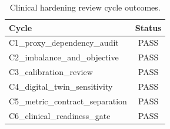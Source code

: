 \begin{table}[t]
\centering
\caption{Clinical hardening review cycle outcomes.}
\label{tab:cycle_gates}
\begin{tabular}{lc}
\toprule
Cycle & Status \\
\midrule
C1_proxy_dependency_audit & PASS \\
C2_imbalance_and_objective & PASS \\
C3_calibration_review & PASS \\
C4_digital_twin_sensitivity & PASS \\
C5_metric_contract_separation & PASS \\
C6_clinical_readiness_gate & PASS \\
\bottomrule
\end{tabular}
\end{table}
